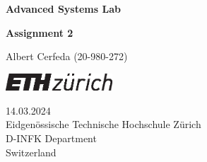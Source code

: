 \documentclass[tikz,14pt,fleqn]{article}
\newcommand\namesurname{Albert Cerfeda (20-980-272)}
\newcommand\assignment{Assignment 2}
\newcommand\subject{Advanced Systems Lab}
\newcommand\documentdate{14.03.2024}
\begin{document}
\begin{titlepage}
   \begin{center}
       \vspace*{0.2cm}

       \textbf{\Large{\subject}}

       \vspace{0.5cm}
        \textbf{\assignment}\\[5mm]
        
            
       \vspace{0.4cm}

        \namesurname
        \begin{figure}[H]
            \centering
        \end{figure}
       \tableofcontents

       \vspace*{\fill}
     
        \includegraphics[width=0.3\textwidth]{fig/eth_logo_kurz_pos.eps}
       
        \documentdate \\
        Eidgenössische Technische Hochschule Zürich\\
        D-INFK Department\\
        Switzerland\\

   \end{center}
\end{titlepage}


\end{document}
